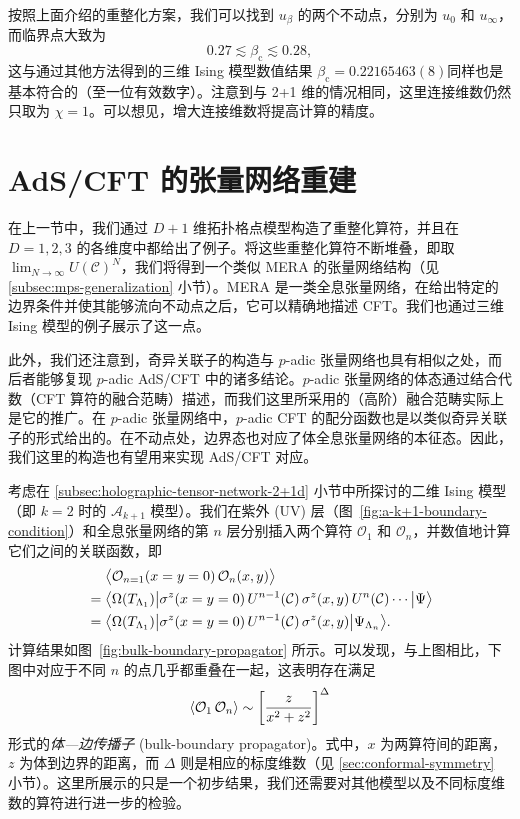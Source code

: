 按照上面介绍的重整化方案，我们可以找到 $u_\beta$ 的两个不动点，分别为 $u_0$ 和 $u_\infty$，而临界点大致为
\begin{equation}
  0.27 \lesssim \beta_{\text{c}} \lesssim 0.28,
\end{equation}
这与通过其他方法得到的三维 Ising 模型数值结果 $\beta_{\text{c}}=0.22165463(8)$\cite{hasenbusch2010finite}同样也是基本符合的（至一位有效数字）。注意到与 2+1 维的情况相同，这里连接维数仍然只取为 $\chi=1$。可以想见，增大连接维数将提高计算的精度。

\section{AdS/CFT 的张量网络重建}
\label{sec:ads-cft-tensor-network}

在上一节中，我们通过 $D+1$ 维拓扑格点模型构造了重整化算符，并且在 $D=1,2,3$ 的各维度中都给出了例子。将这些重整化算符不断堆叠，即取 $\lim_{N\to\infty}U(\mathcal{C})^N$，我们将得到一个类似 MERA 的张量网络结构（见 \ref{subsec:mps-generalization} 小节）。MERA 是一类全息张量网络，在给出特定的边界条件并使其能够流向不动点之后，它可以精确地描述 CFT。我们也通过三维 Ising 模型的例子展示了这一点。

此外，我们还注意到，奇异关联子的构造与 $p$-adic 张量网络也具有相似之处，而后者能够复现 $p$-adic AdS/CFT 中的诸多结论\cite{hung2019padic,chen2021emergent,chen2021bending1,chen2021bending2}。$p$-adic 张量网络的体态通过结合代数（CFT 算符的融合范畴）描述，而我们这里所采用的（高阶）融合范畴实际上是它的推广。在 $p$-adic 张量网络中，$p$-adic CFT 的配分函数也是以类似奇异关联子的形式给出的。在不动点处，边界态也对应了体全息张量网络的本征态。因此，我们这里的构造也有望用来实现 AdS/CFT 对应。

考虑在 \ref{subsec:holographic-tensor-network-2+1d} 小节中所探讨的二维 Ising 模型（即 $k=2$ 时的 $\mathcal{A}_{k+1}$ 模型）。我们在紫外 (UV) 层（图~\ref{fig:a-k+1-boundary-condition}）和全息张量网络的第 $n$ 层分别插入两个算符 $\mathcal{O}_1$ 和 $\mathcal{O}_n$，并数值地计算它们之间的关联函数，即
\begin{align}
  &\mathrel{\phantom{=}}
     \ev[\big]{\mathcal{O}_{n=1}(x=y=0) \, \mathcal{O}_n(x,y)} \notag \\
  &= \bigl\langle \Omega(T_{\Lambda_1}) \big|
     \sigma^z(x=y=0) \, U^{n-1}(\mathcal{C}) \, \sigma^z(x,y) \, U^n(\mathcal{C}) \cdots
     \big| \Psi \bigr\rangle \notag \\
  &= \bigl\langle \Omega(T_{\Lambda_1}) \big|
     \sigma^z(x=y=0) \, U^{n-1}(\mathcal{C}) \, \sigma^z(x,y)
     \big| \Psi_{\Lambda_n} \bigr\rangle.
\end{align}
计算结果如图~\ref{fig:bulk-boundary-propagator} 所示。可以发现，与上图相比，下图中对应于不同 $n$ 的点几乎都重叠在一起，这表明存在满足
\begin{equation}
  \ev{\mathcal{O}_1 \, \mathcal{O}_n} \sim \left[ \frac{z}{x^2+z^2} \right]^\Delta
\end{equation}
形式的\emph{体—边传播子} (bulk-boundary propagator)\cite{witten1998anti}。式中，$x$ 为两算符间的距离，$z$ 为体到边界的距离，而 $\Delta$ 则是相应的标度维数（见 \ref{sec:conformal-symmetry} 小节）。这里所展示的只是一个初步结果，我们还需要对其他模型以及不同标度维数的算符进行进一步的检验。

